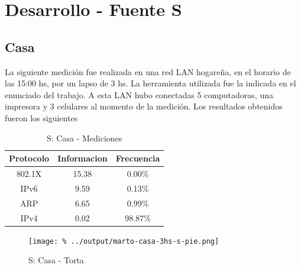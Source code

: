 \documentclass[final,inline,a4paper,narroweqnarray]{ieee}
\begin{document}
\section{Desarrollo - Fuente S}
  \subsection{Casa}

  La siguiente medición fue realizada en una red LAN hogareña, en el
  horario de las 15:00 hs, por un lapso de 3 hs. La herramienta
  utilizada fue la indicada en el enunciado del trabajo. A esta LAN
  hubo conectadas 5 computadoras, una impresora y 3 celulares al
  momento de la medición. Los resultados obtenidos fueron los
  siguientes

\begin{table}\begin{center}
    \begin{tabular}{|c|c|c|}
    \hline
    Protocolo & Informacion & Frecuencia \\ \hline
    802.1X    & 15.38       & 0.00\%     \\ \hline
    IPv6      & 9.59        & 0.13\%     \\ \hline
    ARP       & 6.65        & 0.99\%     \\ \hline
    IPv4      & 0.02        & 98.87\%    \\ \hline
    \end{tabular} 
    \caption{S: Casa - Mediciones}
\end{center}\end{table}



    \begin{figure}[ht]\begin{center}
      \texttt{[image: \%
      ../output/marto-casa-3hs-s-pie.png]}
      \vspace{-3em}
      \caption{S: Casa - Torta}
      \label{marto-casa-3hs-s-pie}
    \end{center}\end{figure}

    
\end{document}
